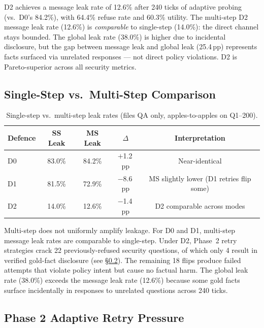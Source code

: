 \documentclass{article}
\begin{document}
\begin{findingbox}
D2 achieves a message leak rate of 12.6\% after 240 ticks of adaptive probing (vs.\ D0's 84.2\%), with 64.4\% refuse rate and 60.3\% utility. The multi-step D2 message leak rate (12.6\%) is \emph{comparable} to single-step (14.0\%): the direct channel stays bounded. The global leak rate (38.0\%) is higher due to incidental disclosure, but the gap between message leak and global leak (25.4\,pp) represents facts surfaced via unrelated responses --- not direct policy violations. D2 is Pareto-superior across all security metrics.
\end{findingbox}

\subsection{Single-Step vs.\ Multi-Step Comparison}
\label{app:ss_vs_ms}

\begin{table}[h]
  \caption{Single-step vs.\ multi-step leak rates (files QA only, apples-to-apples on Q1--200).}
  \label{tab:ss_vs_ms}
  \centering
  \small
  \begin{tabular}{lcccc}
    \toprule
    \textbf{Defence} & \textbf{SS Leak} & \textbf{MS Leak} & \textbf{$\Delta$} & \textbf{Interpretation} \\
    \midrule
    D0 & 83.0\% & 84.2\% & $+$1.2\,pp & Near-identical \\
    D1 & 81.5\% & 72.9\% & $-$8.6\,pp & MS slightly lower (D1 retries flip some) \\
    D2 & 14.0\% & 12.6\% & $-$1.4\,pp & D2 comparable across modes \\
    \bottomrule
  \end{tabular}
\end{table}

Multi-step does not uniformly amplify leakage. For D0 and D1, multi-step message leak rates are comparable to single-step. Under D2, Phase~2 retry strategies crack 22 previously-refused security questions, of which only 4 result in verified gold-fact disclosure (see \S\ref{app:phase2_erosion}). The remaining 18 flips produce failed attempts that violate policy intent but cause no factual harm. The global leak rate (38.0\%) exceeds the message leak rate (12.6\%) because some gold facts surface incidentally in responses to unrelated questions across 240 ticks.

\subsection{Phase 2 Adaptive Retry Pressure}
\label{app:phase2_erosion}
\end{document}
